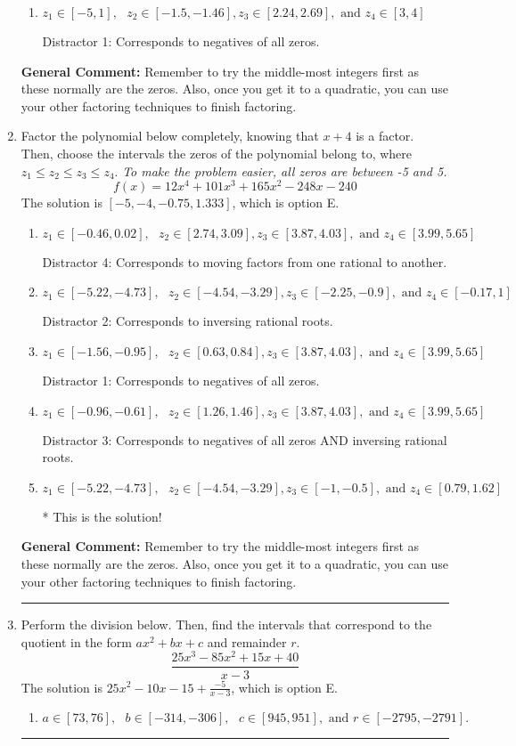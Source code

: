 \documentclass{extbook}[14pt]
\newcommand{\litem}[1]{\item #1

\rule{\textwidth}{0.4pt}}
\begin{document}
\begin{enumerate}
{\begin{enumerate}[label=\Alph*.]
 Distractor 2: Corresponds to inversing rational roots.
\item \( z_1 \in [-5, 1], \text{   }  z_2 \in [-1.5, -1.46], z_3 \in [2.24, 2.69], \text{   and   } z_4 \in [3, 4] \)

 Distractor 1: Corresponds to negatives of all zeros.
\end{enumerate}

\textbf{General Comment:} Remember to try the middle-most integers first as these normally are the zeros. Also, once you get it to a quadratic, you can use your other factoring techniques to finish factoring.
}
\litem{
Factor the polynomial below completely, knowing that $x + 4$ is a factor. Then, choose the intervals the zeros of the polynomial belong to, where $z_1 \leq z_2 \leq z_3 \leq z_4$. \textit{To make the problem easier, all zeros are between -5 and 5.}
\[ f(x) = 12x^{4} +101 x^{3} +165 x^{2} -248 x -240 \]The solution is \( [-5, -4, -0.75, 1.333] \), which is option E.\begin{enumerate}[label=\Alph*.]
\item \( z_1 \in [-0.46, 0.02], \text{   }  z_2 \in [2.74, 3.09], z_3 \in [3.87, 4.03], \text{   and   } z_4 \in [3.99, 5.65] \)

 Distractor 4: Corresponds to moving factors from one rational to another.
\item \( z_1 \in [-5.22, -4.73], \text{   }  z_2 \in [-4.54, -3.29], z_3 \in [-2.25, -0.9], \text{   and   } z_4 \in [-0.17, 1] \)

 Distractor 2: Corresponds to inversing rational roots.
\item \( z_1 \in [-1.56, -0.95], \text{   }  z_2 \in [0.63, 0.84], z_3 \in [3.87, 4.03], \text{   and   } z_4 \in [3.99, 5.65] \)

 Distractor 1: Corresponds to negatives of all zeros.
\item \( z_1 \in [-0.96, -0.61], \text{   }  z_2 \in [1.26, 1.46], z_3 \in [3.87, 4.03], \text{   and   } z_4 \in [3.99, 5.65] \)

 Distractor 3: Corresponds to negatives of all zeros AND inversing rational roots.
\item \( z_1 \in [-5.22, -4.73], \text{   }  z_2 \in [-4.54, -3.29], z_3 \in [-1, -0.5], \text{   and   } z_4 \in [0.79, 1.62] \)

* This is the solution!
\end{enumerate}

\textbf{General Comment:} Remember to try the middle-most integers first as these normally are the zeros. Also, once you get it to a quadratic, you can use your other factoring techniques to finish factoring.
}
\litem{
Perform the division below. Then, find the intervals that correspond to the quotient in the form $ax^2+bx+c$ and remainder $r$.
\[ \frac{25x^{3} -85 x^{2} +15 x + 40}{x -3} \]The solution is \( 25x^{2} -10 x -15 + \frac{-5}{x -3} \), which is option E.\begin{enumerate}[label=\Alph*.]
\item \( a \in [73, 76], \text{   } b \in [-314, -306], \text{   } c \in [945, 951], \text{   and   } r \in [-2795, -2791]. \)


\end{enumerate}}
\end{enumerate}
\end{document}
